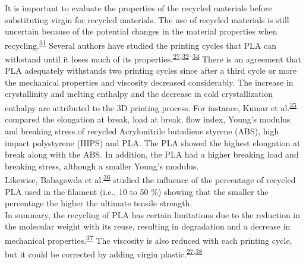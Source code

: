 \documentclass[
  12pt]{article}
\begin{document}
It is important to evaluate the properties of the recycled materials before substituting virgin for recycled materials.
The use of recycled materials is still uncertain because of the potential changes in the material properties when recycling.\textsuperscript{\protect\hyperlink{ref-Suarez2020}{31}}
Several authors have studied the printing cycles that PLA can withstand until it loses much of its properties.\textsuperscript{\protect\hyperlink{ref-Zhao2018}{27},\protect\hyperlink{ref-CruzSanchez2017}{32}--\protect\hyperlink{ref-Anderson2017}{34}}
There is an agreement that PLA adequately withstands two printing cycles since after a third cycle or more the mechanical properties and viscosity decreased considerably.
The increase in crystallinity and melting enthalpy and the decrease in cold crystallization enthalpy are attributed to the 3D printing process.
For instance, Kumar et al.\textsuperscript{\protect\hyperlink{ref-Kumar2018b}{35}} compared the elongation at break, load at break, flow index, Young's modulus and breaking stress of recycled Acrylonitrile butadiene styrene (ABS), high impact polystyrene (HIPS) and PLA.
The PLA showed the highest elongation at break along with the ABS. In addition, the PLA had a higher breaking load and breaking stress, although a smaller Young's modulus.\\
Likewise, Babagowda et al.\textsuperscript{\protect\hyperlink{ref-Babagowda2018}{36}} studied the influence of the percentage of recycled PLA used in the filament (i.e., 10 to 50 \%) showing that the smaller the percentage the higher the ultimate tensile strength.\\
In summary, the recycling of PLA has certain limitations due to the reduction in the molecular weight with its reuse, resulting in degradation and a decrease in mechanical properties.\textsuperscript{\protect\hyperlink{ref-Pinho2020}{37}}
The viscosity is also reduced with each printing cycle, but it could be corrected by adding virgin plastic.\textsuperscript{\protect\hyperlink{ref-Zhao2018}{27},\protect\hyperlink{ref-Zhao2018a}{38}}
\end{document}
